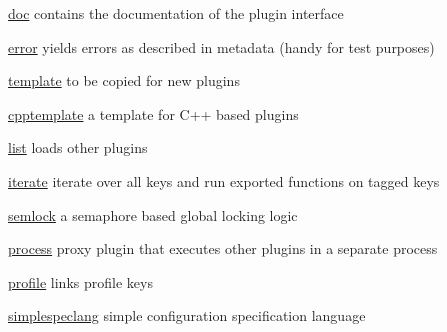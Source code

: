 \begin{DoxyItemize}
\item \hyperlink{md_src_plugins_doc_README_src_plugins_doc_README_md}{doc} contains the documentation of the plugin interface
\item \hyperlink{md_src_plugins_error_README_src_plugins_error_README_md}{error} yields errors as described in metadata (handy for test purposes)
\item \hyperlink{md_src_plugins_template_README_src_plugins_template_README_md}{template} to be copied for new plugins
\item \hyperlink{md_src_plugins_cpptemplate_README_src_plugins_cpptemplate_README_md}{cpptemplate} a template for C++ based plugins
\item \hyperlink{md_src_plugins_list_README_src_plugins_list_README_md}{list} loads other plugins
\item \hyperlink{md_src_plugins_iterate_README_src_plugins_iterate_README_md}{iterate} iterate over all keys and run exported functions on tagged keys
\item \hyperlink{md_src_plugins_semlock_README_src_plugins_semlock_README_md}{semlock} a semaphore based global locking logic
\item \hyperlink{md_src_plugins_process_README_src_plugins_process_README_md}{process} proxy plugin that executes other plugins in a separate process
\item \hyperlink{md_src_plugins_profile_README_src_plugins_profile_README_md}{profile} links profile keys
\item \hyperlink{md_src_plugins_simplespeclang_README_src_plugins_simplespeclang_README_md}{simplespeclang} simple configuration specification language 
\end{DoxyItemize}